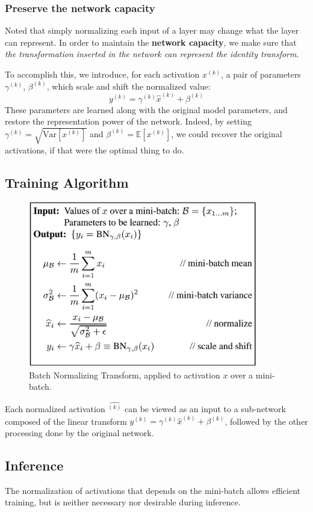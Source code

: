 \documentclass[a3paper, 12pt]{book} %
\begin{document}
\subsubsection{Preserve the network capacity}
Noted that simply normalizing each input of a layer may change what the layer can represent. In order to maintain the \textbf{network capacity}, we make sure that \emph{the transformation inserted in the network can represent the identity transform}.

To accomplish this, we introduce, for each activation $x^{(k)}$, a pair of parameters $\gamma^{(k)}$, $\beta^{(k)}$, which scale and shift the normalized value:
$$y^{(k)}=\gamma^{(k)}\hat{x}^{(k)}+\beta^{(k)}$$
These parameters are learned along with the original
model parameters, and restore the representation power
of the network. Indeed, by setting $\gamma^{(k)} = \sqrt{\mathrm{Var}{[x^{(k)}]}}$ and
$\beta^{(k)} = \mathbb{E}[x^{(k)}]$, we could recover the original activations,
if that were the optimal thing to do.

\subsection{Training Algorithm}
\begin{figure}[htpb]
	\centering
	\includegraphics[width=10cm]{figures/bn_algorithm.png}
	\caption{Batch Normalizing Transform, applied to
activation $x$ over a mini-batch.}
	\label{fig:boat1}
\end{figure}
Each normalized activation $\hat{^{(k)}}$ can be viewed as an input to a sub-network composed of the linear transform $y^{(k)}=\gamma^{(k)}\hat{x}^{(k)}+\beta^{(k)}$, followed by the other processing done by the original network. 

\subsection{Inference}
The normalization of activations that
depends on the mini-batch allows efficient training, but is
neither necessary nor desirable during inference.
\end{document}
